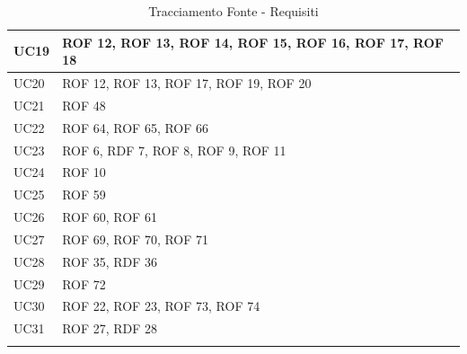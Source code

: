 \documentclass[12pt, oneside]{article}
\begin{document}
\begin{longtable}{|p{4cm}|p{12cm}|}
    \hline
    UC19 & ROF 12, ROF 13, ROF 14, ROF 15, ROF 16, ROF 17, ROF 18 \\
    \hline
    UC20 & ROF 12, ROF 13, ROF 17, ROF 19, ROF 20\\
    \hline
    UC21 & ROF 48 \\
    \hline
    UC22 & ROF 64, ROF 65, ROF 66 \\
    \hline
    UC23 & ROF 6, RDF 7, ROF 8, ROF 9, ROF 11 \\
    \hline
    UC24 & ROF 10\\
    \hline
    UC25 & ROF 59 \\
    \hline
    UC26 & ROF 60, ROF 61 \\
    \hline
    UC27 & ROF 69, ROF 70, ROF 71 \\
    \hline
    UC28 & ROF 35, RDF 36 \\
    \hline
    UC29 & ROF 72 \\
    \hline
    UC30 & ROF 22, ROF 23, ROF 73, ROF 74 \\
    \hline
    UC31 & ROF 27, RDF 28 \\
    \hline

\caption{Tracciamento Fonte - Requisiti}
    
\end{longtable}
\end{document}
